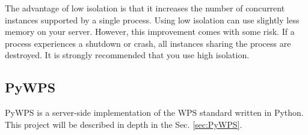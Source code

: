\begin{figure}[h!]
\centering
\begin{floatrow}
\end{floatrow}
\end{figure}

The advantage of low isolation is that it increases the number of concurrent instances supported by a single process. Using low isolation can use slightly less memory on your server. However, this improvement comes with some risk. If a process experiences a shutdown or crash, all instances sharing the process are destroyed. It is strongly recommended that you use high isolation.\cite{AG_docs}

\subsection{PyWPS}
PyWPS is a server-side implementation of the WPS standard written in Python. This project will be described in depth in the Sec. \ref{sec:PyWPS}.
